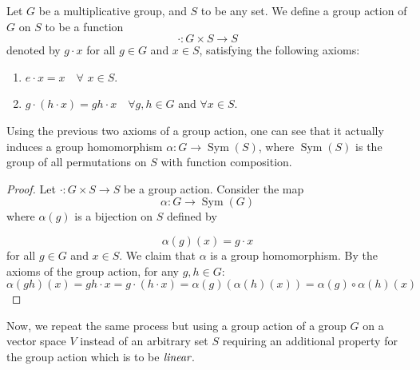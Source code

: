\begin{definition}
    Let $G$ be a multiplicative group, and $S$ to be any set. We define a group action of $G$ on $S$ to be a function 
    \[
    \cdot: G \times S \to S
    \]
    denoted by $g \cdot x$ for all $g \in G$ and $x \in S$, satisfying the following axioms:
    \begin{enumerate}
        \item $e \cdot x = x  \quad\forall \,\, x \in S$.
        \item $g \cdot (h \cdot x) = gh \cdot x \quad \forall g,h \in G$ and $\forall x \in S$.
    \end{enumerate}

\end{definition}
Using the previous two axioms of a group action, one can see that it actually induces a group homomorphism $\alpha: G \to \operatorname{Sym}(S)$, where $\operatorname{Sym}(S)$ is the group of all permutations on $S$ with function composition.
\begin{proof}
    Let $\cdot : G \times S \to S$ be a group action. Consider the map 
    \[
    \alpha: G \to \operatorname{Sym}(G)
    \] 
    where $\alpha(g)$ is a bijection on $S$ defined by
    
    \[\alpha(g)(x) = g \cdot x \]
    for all $g \in G$ and $x \in S$. We claim that $\alpha$ is a group homomorphism. By the axioms of the group action, for any $g,h \in G$: 
    \[
    \alpha(gh)(x) = gh \cdot x = g \cdot (h \cdot x) = \alpha(g)(\alpha(h)(x)) = \alpha(g) \circ \alpha(h) (x)
    \]
\end{proof}

Now, we repeat the same process but using a group action of a group $G$ on a vector space $V$ instead of an arbitrary set $S$ requiring an additional property for the group action which is to be $\emph{linear}$.

